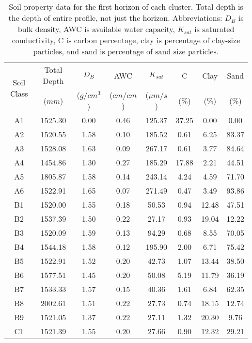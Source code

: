 \begin{table}[h!]
	\caption{Soil property data for the first horizon of each cluster. Total depth is the depth of entire profile, not just the horizon. Abbreviations: $D_B$ is bulk density, AWC is available water capacity, $K_{sat}$ is saturated conductivity, C is carbon percentage, clay is percentage of clay-size particles, and sand is percentage of sand size particles.}
	\centering
		\begin{tabular}{c c c c c c c c}
			\hline
			\multirow{2}{*}{Soil Class}	 & 	Total Depth	 & 	$D_B$	 & 	AWC	 & 	$K_{sat}$	 & 	C	 & 	Clay	 & 	Sand \\		 	 			& 	($mm$)	 	& ($g/cm^3$)& ($cm/cm$)& 	($\mu m/s$)	 & 	(\%)	 & 	(\%)	 & 	(\%) \\[0.5ex]
			\hline \hline 
			A1	 & 	1525.30	 & 	0.00	 & 	0.46	 & 	125.37	 & 	37.25	 & 	0.00	 & 	0.00  \\
			A2	 & 	1520.55	 & 	1.58	 & 	0.10	 & 	185.52	 & 	0.61	 & 	6.25	 & 	83.37 \\
			A3	 & 	1528.08	 & 	1.63	 & 	0.09	 & 	267.17	 & 	0.61	 & 	3.77	 & 	84.64 \\
			A4	 & 	1454.86	 & 	1.30	 & 	0.27	 & 	185.29	 & 	17.88	 & 	2.21	 & 	44.51 \\
			A5	 & 	1805.87	 & 	1.58	 & 	0.14	 & 	243.14	 & 	4.24	 & 	4.59	 & 	71.70 \\
			A6	 & 	1522.91	 & 	1.65	 & 	0.07	 & 	271.49	 & 	0.47	 & 	3.49	 & 	93.86 \\
			B1	 & 	1520.00	 & 	1.55	 & 	0.18	 & 	50.53	 & 	0.94	 & 	12.48	 & 	47.51 \\
			B2	 & 	1537.39	 & 	1.50	 & 	0.22	 & 	27.17	 & 	0.93	 & 	19.04	 & 	12.22 \\
			B3	 & 	1520.09	 & 	1.59	 & 	0.13	 & 	94.29	 & 	0.68	 & 	8.55	 & 	70.05 \\
			B4	 & 	1544.18	 & 	1.58	 & 	0.12	 & 	195.90	 & 	2.00	 & 	6.71	 & 	75.42 \\
			B5	 & 	1522.91	 & 	1.52	 & 	0.20	 & 	42.73	 & 	1.07	 & 	13.44	 & 	38.50 \\
			B6	 & 	1577.51	 & 	1.45	 & 	0.20	 & 	50.08	 & 	5.19	 & 	11.79	 & 	36.19 \\
			B7	 & 	1533.33	 & 	1.57	 & 	0.15	 & 	40.36	 & 	1.61	 & 	6.84	 & 	62.35 \\
			B8	 & 	2002.61	 & 	1.51	 & 	0.22	 & 	27.73	 & 	0.74	 & 	18.15	 & 	12.74 \\
			B9	 & 	1521.05	 & 	1.37	 & 	0.22	 & 	27.11	 & 	1.32	 & 	20.30	 & 	9.76 \\
			C1	 & 	1521.39	 & 	1.55	 & 	0.20	 & 	27.66	 & 	0.90	 & 	12.32	 & 	29.21 \\

\end{tabular}
\end{table}
